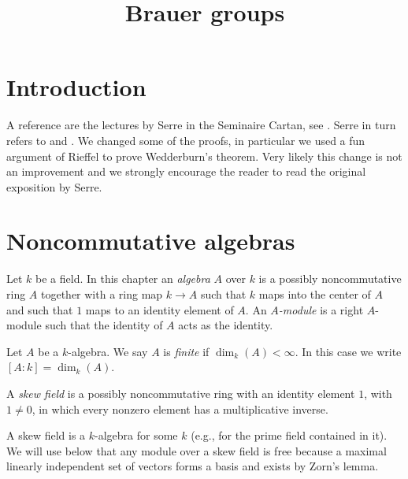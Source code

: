

%


\title{Brauer groups}


\maketitle

\label{section-phantom}

\tableofcontents

\section{Introduction}
\label{section-introduction}

\noindent
A reference are the lectures by Serre in the Seminaire Cartan, see
\cite{Serre-Cartan}. Serre in turn refers to
\cite{Deuring} and \cite{ANT}. We changed some of the proofs, in particular
we used a fun argument of Rieffel to prove Wedderburn's theorem.
Very likely this change is not an improvement and we strongly
encourage the reader to read the original exposition by Serre.


\section{Noncommutative algebras}
\label{section-algebras}

\noindent
Let $k$ be a field. In this chapter an {\it algebra} $A$ over $k$ is
a possibly noncommutative ring $A$ together with a ring map
$k \to A$ such that $k$ maps into the center of $A$ and such that
$1$ maps to an identity element of $A$. An {\it $A$-module} is a right
$A$-module such that the identity of $A$ acts as the identity.

\begin{definition}
\label{definition-finite}
Let $A$ be a $k$-algebra. We say $A$ is {\it finite} if $\dim_k(A) < \infty$.
In this case we write $[A : k] = \dim_k(A)$.
\end{definition}

\begin{definition}
\label{definition-skew-field}
A {\it skew field} is a possibly noncommutative ring with an identity
element $1$, with $1 \not = 0$, in which every nonzero element
has a multiplicative inverse.
\end{definition}

\noindent
A skew field is a $k$-algebra for some $k$ (e.g., for the prime field
contained in it). We will use below that any module over a skew field
is free because a maximal linearly independent set of vectors forms a
basis and exists by Zorn's lemma.

